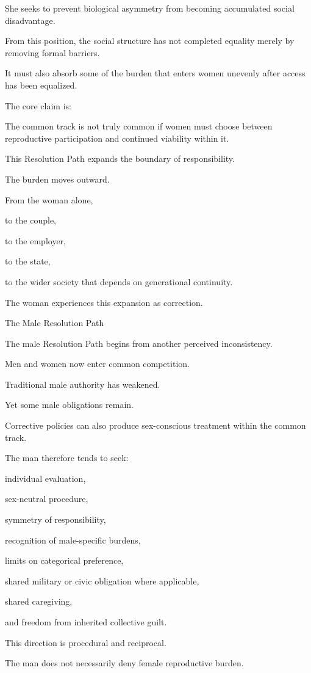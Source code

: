 She seeks to prevent biological asymmetry from becoming accumulated social disadvantage.

From this position, the social structure has not completed equality merely by removing formal barriers.

It must also absorb some of the burden that enters women unevenly after access has been equalized.

The core claim is:

The common track is not truly common if women must choose between reproductive participation and continued viability within it.

This Resolution Path expands the boundary of responsibility.

The burden moves outward.

From the woman alone,

to the couple,

to the employer,

to the state,

to the wider society that depends on generational continuity.

The woman experiences this expansion as correction.

The Male Resolution Path

The male Resolution Path begins from another perceived inconsistency.

Men and women now enter common competition.

Traditional male authority has weakened.

Yet some male obligations remain.

Corrective policies can also produce sex-conscious treatment within the common track.

The man therefore tends to seek:

individual evaluation,

sex-neutral procedure,

symmetry of responsibility,

recognition of male-specific burdens,

limits on categorical preference,

shared military or civic obligation where applicable,

shared caregiving,

and freedom from inherited collective guilt.

This direction is procedural and reciprocal.

The man does not necessarily deny female reproductive burden.

